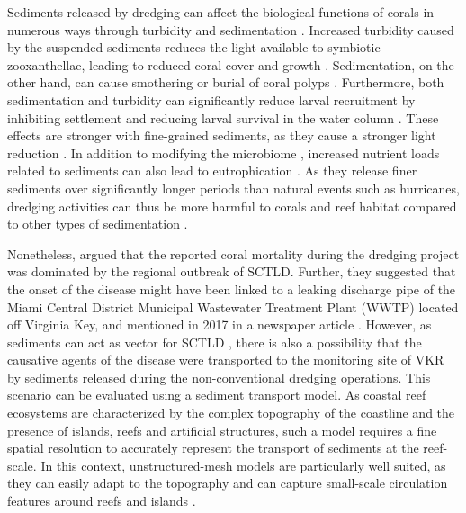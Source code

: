 \documentclass[preprint,12pt,authoryear]{elsarticle}
\begin{document}
Sediments released by dredging can affect the biological functions of corals in numerous ways  through turbidity and sedimentation \citep{erftemeijer2012environmental,jones2015effects}. Increased turbidity caused by the suspended sediments reduces the light available to symbiotic zooxanthellae, leading to reduced coral cover and growth \citep{kendall1983effects,rogers1990responses,anthony1999tank,hennige2008photoacclimation}. Sedimentation, on the other hand, can cause smothering or burial of coral polyps \citep{erftemeijer2012environmental,jones2015effects,jones2019sediment}. Furthermore, both sedimentation and turbidity can significantly reduce larval recruitment by inhibiting settlement and reducing larval survival in the water column \citep{jones2015effects}. These effects are stronger with fine-grained sediments, as they cause a stronger light reduction \citep{storlazzi2015influence,fourney2017additive}. In addition to modifying the microbiome \citep{rosales2019oceanographic}, increased nutrient loads related to sediments can also lead to eutrophication \citep{wittenberg1992effects}.
As they release finer sediments over significantly longer periods than natural events such as hurricanes, dredging activities can thus be more harmful to corals and reef habitat compared to other types of sedimentation \citep{cunning2019extensive}.

Nonetheless, \cite{gintert2019regional} argued that the reported coral mortality during the dredging project was dominated by the regional outbreak of SCTLD. Further, they suggested that the onset of the disease might have been linked to a leaking discharge pipe of the Miami Central District Municipal Wastewater Treatment Plant (WWTP) located off Virginia Key, and mentioned in 2017 in a newspaper article \citep{staletovich2017}. However, as sediments can act as vector for SCTLD \citep{studivan2022reef}, there is also a possibility that the causative agents of the disease were transported to the monitoring site of VKR by sediments released during the non-conventional dredging operations. This scenario can be evaluated using a sediment transport model. As coastal reef ecosystems are characterized by the complex topography of the coastline and the presence of islands, reefs and artificial structures, such a model requires a fine spatial resolution to accurately represent the transport of sediments at the reef-scale. In this context, unstructured-mesh models are particularly well suited, as they can easily adapt to the topography \citep{fringer2019future} and can capture small-scale circulation features around reefs and islands \citep{lambrechts2008multi}.
\end{document}
